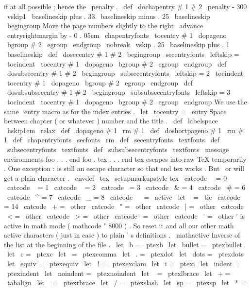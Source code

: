 {{{%
if
at
all
possible
;
hence
the
\
penalty
.
\
def
\
dochapentry
#
1
#
2
{
%
\
penalty
-
300
\
vskip1
\
baselineskip
plus
.
33
\
baselineskip
minus
.
25
\
baselineskip
\
begingroup
%
Move
the
page
numbers
slightly
to
the
right
\
advance
\
entryrightmargin
by
-
0
.
05em
\
chapentryfonts
\
tocentry
{
#
1
}
{
\
dopageno
\
bgroup
#
2
\
egroup
}
%
\
endgroup
\
nobreak
\
vskip
.
25
\
baselineskip
plus
.
1
\
baselineskip
}
\
def
\
dosecentry
#
1
#
2
{
\
begingroup
\
secentryfonts
\
leftskip
=
\
tocindent
\
tocentry
{
#
1
}
{
\
dopageno
\
bgroup
#
2
\
egroup
}
%
\
endgroup
}
\
def
\
dosubsecentry
#
1
#
2
{
\
begingroup
\
subsecentryfonts
\
leftskip
=
2
\
tocindent
\
tocentry
{
#
1
}
{
\
dopageno
\
bgroup
#
2
\
egroup
}
%
\
endgroup
}
\
def
\
dosubsubsecentry
#
1
#
2
{
\
begingroup
\
subsubsecentryfonts
\
leftskip
=
3
\
tocindent
\
tocentry
{
#
1
}
{
\
dopageno
\
bgroup
#
2
\
egroup
}
%
\
endgroup
}
%
We
use
the
same
\
entry
macro
as
for
the
index
entries
.
\
let
\
tocentry
=
\
entry
%
Space
between
chapter
(
or
whatever
)
number
and
the
title
.
\
def
\
labelspace
{
\
hskip1em
\
relax
}
\
def
\
dopageno
#
1
{
{
\
rm
#
1
}
}
\
def
\
doshortpageno
#
1
{
{
\
rm
#
1
}
}
\
def
\
chapentryfonts
{
\
secfonts
\
rm
}
\
def
\
secentryfonts
{
\
textfonts
}
\
def
\
subsecentryfonts
{
\
textfonts
}
\
def
\
subsubsecentryfonts
{
\
textfonts
}
\
message
{
environments
}
%
foo
.
.
.
end
foo
.
%
tex
.
.
.
end
tex
escapes
into
raw
TeX
temporarily
.
%
One
exception
:
is
still
an
escape
character
so
that
end
tex
works
.
%
But
\
or
will
get
a
plain
character
.
\
envdef
\
tex
{
%
\
setupmarkupstyle
{
tex
}
%
\
catcode
\
\
=
0
\
catcode
\
{
=
1
\
catcode
\
}
=
2
\
catcode
\
=
3
\
catcode
\
&
=
4
\
catcode
\
#
=
6
\
catcode
\
^
=
7
\
catcode
\
_
=
8
\
catcode
\
~
=
\
active
\
let
~
=
\
tie
\
catcode
\
%
=
14
\
catcode
\
+
=
\
other
\
catcode
\
"
=
\
other
\
catcode
\
|
=
\
other
\
catcode
\
<
=
\
other
\
catcode
\
>
=
\
other
\
catcode
\
=
\
other
\
catcode
\
'
=
\
other
%
%
'
is
active
in
math
mode
(
mathcode
"
8000
)
.
So
reset
it
and
all
our
%
other
math
active
characters
(
just
in
case
)
to
plain
'
s
definitions
.
\
mathactive
%
%
Inverse
of
the
list
at
the
beginning
of
the
file
.
\
let
\
b
=
\
ptexb
\
let
\
bullet
=
\
ptexbullet
\
let
\
c
=
\
ptexc
\
let
\
=
\
ptexcomma
\
let
\
.
=
\
ptexdot
\
let
\
dots
=
\
ptexdots
\
let
\
equiv
=
\
ptexequiv
\
let
\
!
=
\
ptexexclam
\
let
\
i
=
\
ptexi
\
let
\
indent
=
\
ptexindent
\
let
\
noindent
=
\
ptexnoindent
\
let
\
{
=
\
ptexlbrace
\
let
\
+
=
\
tabalign
\
let
\
}
=
\
ptexrbrace
\
let
\
/
=
\
ptexslash
\
let
\
sp
=
\
ptexsp
\
let
\
*
=
\
}}}}
